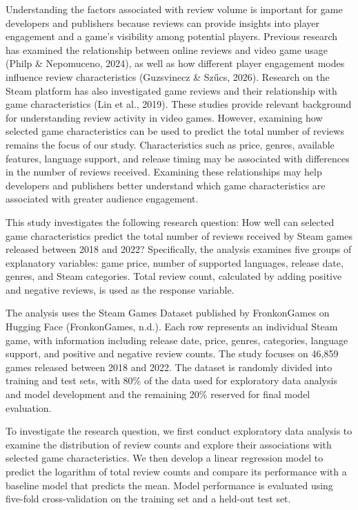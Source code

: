 \documentclass[
  letterpaper,
  DIV=11,
  numbers=noendperiod]{scrartcl}
\begin{document}
Understanding the factors associated with review volume is important for
game developers and publishers because reviews can provide insights into
player engagement and a game's visibility among potential players.
Previous research has examined the relationship between online reviews
and video game usage (Philp \& Nepomuceno, 2024), as well as how
different player engagement modes influence review characteristics
(Guzsvinecz \& Szűcs, 2026). Research on the Steam platform has also
investigated game reviews and their relationship with game
characteristics (Lin et al., 2019). These studies provide relevant
background for understanding review activity in video games. However,
examining how selected game characteristics can be used to predict the
total number of reviews remains the focus of our study. Characteristics
such as price, genres, available features, language support, and release
timing may be associated with differences in the number of reviews
received. Examining these relationships may help developers and
publishers better understand which game characteristics are associated
with greater audience engagement.

This study investigates the following research question: How well can
selected game characteristics predict the total number of reviews
received by Steam games released between 2018 and 2022? Specifically,
the analysis examines five groups of explanatory variables: game price,
number of supported languages, release date, genres, and Steam
categories. Total review count, calculated by adding positive and
negative reviews, is used as the response variable.

The analysis uses the Steam Games Dataset published by FronkonGames on
Hugging Face (FronkonGames, n.d.). Each row represents an individual
Steam game, with information including release date, price, genres,
categories, language support, and positive and negative review counts.
The study focuses on 46,859 games released between 2018 and 2022. The
dataset is randomly divided into training and test sets, with 80\% of
the data used for exploratory data analysis and model development and
the remaining 20\% reserved for final model evaluation.

To investigate the research question, we first conduct exploratory data
analysis to examine the distribution of review counts and explore their
associations with selected game characteristics. We then develop a
linear regression model to predict the logarithm of total review counts
and compare its performance with a baseline model that predicts the
mean. Model performance is evaluated using five-fold cross-validation on
the training set and a held-out test set.
\end{document}
